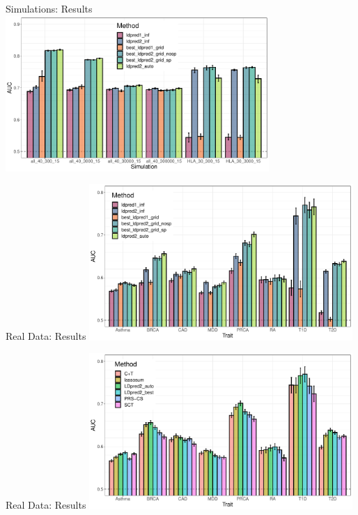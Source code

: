 \documentclass{beamer}
\begin{document}
    \begin{frame}[t]{Simulations: Results}
    \includegraphics[width=100mm,scale=1]{AUC-simu.pdf}
 
      \end{frame}
      
   
       \begin{frame}[t]{Real Data: Results}
       \includegraphics[width=100mm,scale=1]{AUC-real.pdf}
    \end{frame}
    
       \begin{frame}[t]{Real Data: Results}
       \includegraphics[width=100mm,scale=1]{AUC-all.pdf}
    \end{frame}
    
    
        
\end{document}
